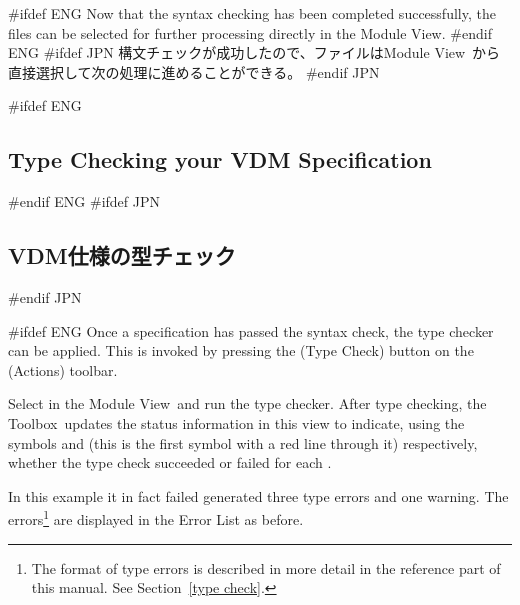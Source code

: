\documentclass[\pformat,12pt]{article}
\newcommand{\Toolbox}{Toolbox}
\newcommand{\vdmModView}{\guicmd{Module View}}
\newcommand{\vdmModView}{\guicmd{モジュールビュー}}
\newcommand{\Toolbox}{Toolbox}
\newcommand{\vdmModView}{\guicmd{VDM View}}
\newcommand{\vdmModView}{\guicmd{VDMビュー}}
\newcommand{\guicmd}[1]{{\sf #1}}
\newcommand{\guicmd}[1]{{\gt #1}}
\begin{document}
#ifdef ENG
Now that the syntax checking has been completed successfully, the
files can be selected for further processing directly in the \vdmModView.
#endif ENG
#ifdef JPN
構文チェックが成功したので、ファイルは\vdmModView\ から直接選択して次の処理に進めることができる。
#endif JPN

#ifdef ENG
\subsection{Type Checking your VDM Specification}
\label{sec:gde-tc}
#endif ENG
#ifdef JPN
\subsection{VDM仕様の型チェック}
\label{sec:gde-tc}
#endif JPN

#ifdef ENG
Once a specification has passed the syntax check, the type checker
can be applied. This is invoked by pressing the 
(\guicmd{Type Check}) button on the (\guicmd{Actions}) toolbar.

Select  in the \vdmModView\ and run the type 
checker. After type checking, the \Toolbox\ updates the status 
  information in this view to indicate,
using the symbols 
and
(this is the first symbol
with a red line through it) 
respectively, whether the type check succeeded or failed for each
.

In this example it in fact failed 
generated three type errors and one warning. The errors\footnote{The
  format of type errors is described in more detail in the reference
  part of this manual. See Section~\ref{type check}.} are displayed in
the \guicmd{Error List} as before.
\end{document}
